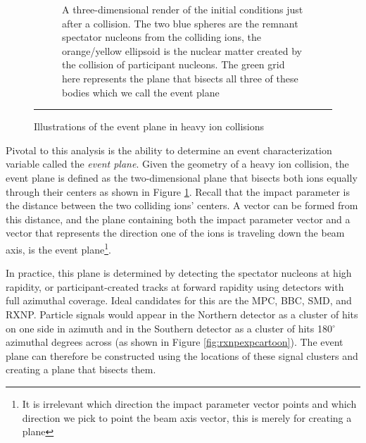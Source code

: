 \begin{figure}[htbp!]
\begin{subfigure}[p]{0.7\textwidth}
	\caption[Central vs Peripheral collisions, geometry of initial conditions]{A three-dimensional render of the initial conditions just after a collision. The two blue spheres are the remnant spectator nucleons from the colliding ions, the orange/yellow ellipsoid is the nuclear matter created by the collision of participant nucleons. The green grid here represents the plane that bisects all three of these bodies which we call the event plane}
    \end{subfigure}
    \rule{35em}{0.5pt}
  \caption[Illustrations of the event plane in heavy ion collisions]{Illustrations of the event plane in heavy ion collisions}
  \label{fig:evtpln}
\end{figure}

Pivotal to this analysis is the ability to determine an event characterization variable called the \textit{event plane}. Given the geometry of a heavy ion collision, the event plane is defined as the two-dimensional plane that bisects both ions equally through their centers as shown in Figure \ref{fig:evtpln}. Recall that the impact parameter is the distance between the two colliding ions' centers. A vector can be formed from this distance, and the plane containing both the impact parameter vector and a vector that represents the direction one of the ions is traveling down the beam axis, is the event plane\footnote{It is irrelevant which direction the impact parameter vector points and which direction we pick to point the beam axis vector, this is merely for creating a plane}.

In practice, this plane is determined by detecting the spectator nucleons at high rapidity, or participant-created tracks at forward rapidity using detectors with full azimuthal coverage. Ideal candidates for this are the MPC, BBC, SMD, and RXNP. Particle signals would appear in the Northern detector as a cluster of hits on one side in azimuth and in the Southern detector as a cluster of hits 180$^\circ$ azimuthal degrees across (as shown in Figure \ref{fig:rxnpexpcartoon}). The event plane can therefore be constructed using the locations of these signal clusters and creating a plane that bisects them.


